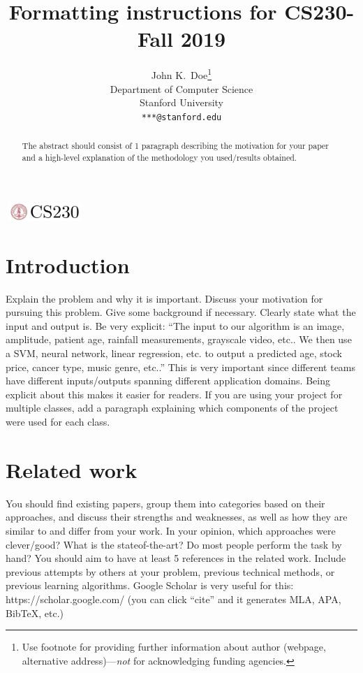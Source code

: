 \documentclass{article}
\title{Formatting instructions for CS230-Fall 2019}
\author{
  John K.~Doe\thanks{Use footnote for providing further
    information about author (webpage, alternative
    address)---\emph{not} for acknowledging funding agencies.} \\
  Department of Computer Science\\
  Stanford University\\
  \texttt{***@stanford.edu} \\
}
\begin{document}

\begin{center}
\includegraphics[width=3cm, height=0.7cm]{CS230}
\end{center}

\maketitle

\begin{abstract}
The abstract should consist of 1 paragraph describing the motivation for your paper and a high-level explanation of the methodology you used/results obtained.
\end{abstract}

\section{Introduction}	
Explain the problem and why it is important. Discuss your motivation for pursuing this
problem. Give some background if necessary. Clearly state what the input and output
is. Be very explicit: “The input to our algorithm is an {image, amplitude, patient age,
rainfall measurements, grayscale video, etc.}. We then use a {SVM, neural network, linear
regression, etc.} to output a predicted {age, stock price, cancer type, music genre, etc.}.”
This is very important since different teams have different inputs/outputs spanning different
application domains. Being explicit about this makes it easier for readers. If you are using
your project for multiple classes, add a paragraph explaining which components of the
project were used for each class.

\section{Related work}
You should find existing papers, group them into categories based on their approaches,
and discuss their strengths and weaknesses, as well as how they are similar to and differ
from your work. In your opinion, which approaches were clever/good? What is the stateof-the-art?
Do most people perform the task by hand? You should aim to have at least
5 references in the related work. Include previous attempts by others at your problem,
previous technical methods, or previous learning algorithms. Google Scholar is very useful
for this: https://scholar.google.com/ (you can click “cite” and it generates MLA, APA,
BibTeX, etc.)
\end{document}
